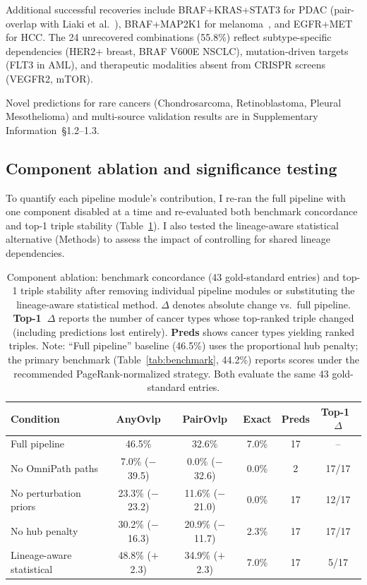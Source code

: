 \documentclass[11pt]{article}
\begin{document}
Additional successful recoveries include BRAF+KRAS+STAT3 for PDAC (pair-overlap with Liaki et al.~\cite{Liaki2025}), BRAF+MAP2K1 for melanoma~\cite{Long2014}, and EGFR+MET for HCC. The 24 unrecovered combinations (55.8\%) reflect subtype-specific dependencies (HER2+ breast, BRAF V600E NSCLC), mutation-driven targets (FLT3 in AML), and therapeutic modalities absent from CRISPR screens (VEGFR2, mTOR).

Novel predictions for rare cancers (Chondrosarcoma, Retinoblastoma, Pleural Mesothelioma) and multi-source validation results are in Supplementary Information~\S1.2--1.3.

\subsection*{Component ablation and significance testing}
To quantify each pipeline module's contribution, I re-ran the full pipeline with one component disabled at a time and re-evaluated both benchmark concordance and top-1 triple stability (Table~\ref{tab:ablation}). I also tested the lineage-aware statistical alternative (Methods) to assess the impact of controlling for shared lineage dependencies.

\begin{table}[htbp]
\centering
\caption{Component ablation: benchmark concordance (43 gold-standard entries) and top-1 triple stability after removing individual pipeline modules or substituting the lineage-aware statistical method. $\Delta$ denotes absolute change vs.\ full pipeline. \textbf{Top-1~$\Delta$} reports the number of cancer types whose top-ranked triple changed (including predictions lost entirely). \textbf{Preds} shows cancer types yielding ranked triples. Note: ``Full pipeline'' baseline (46.5\%) uses the proportional hub penalty; the primary benchmark (Table~\ref{tab:benchmark}, 44.2\%) reports scores under the recommended PageRank-normalized strategy. Both evaluate the same 43 gold-standard entries.}
\label{tab:ablation}
\small
\begin{tabular}{@{}lccccc@{}}
\toprule
\textbf{Condition} & \textbf{AnyOvlp} & \textbf{PairOvlp} & \textbf{Exact} & \textbf{Preds} & \textbf{Top-1~$\Delta$} \\
\midrule
Full pipeline             & 46.5\% & 32.6\% & 7.0\% & 17 & -- \\
No OmniPath paths         & \phantom{0}7.0\% ($-$39.5) & \phantom{0}0.0\% ($-$32.6) & 0.0\% & \phantom{0}2 & 17/17 \\
No perturbation priors    & 23.3\% ($-$23.2) & 11.6\% ($-$21.0) & 0.0\% & 17 & 12/17 \\
No hub penalty            & 30.2\% ($-$16.3) & 20.9\% ($-$11.7) & 2.3\% & 17 & 17/17 \\
Lineage-aware statistical & 48.8\% ($+$2.3) & 34.9\% ($+$2.3) & 7.0\% & 17 & \phantom{0}5/17 \\
\bottomrule
\end{tabular}
\end{table}
\end{document}
